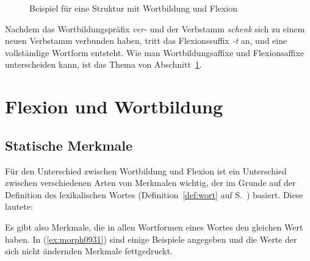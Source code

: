 \begin{figure}[!htbp]
  \centering
  \caption{Beispiel für eine Struktur mit Wortbildung und Flexion}
  \label{fig:flexwbtree}
\end{figure}

Nachdem das Wortbildungspräfix \textit{ver-} und der Verbstamm \textit{schenk} sich zu einem neuen Verbstamm verbunden haben, tritt das Flexionssuffix \textit{-t} an, und eine vollständige Wortform entsteht.
Wie man Wortbildungsaffixe und Flexionsaffixe unterscheiden kann, ist das Thema von Abschnitt~\ref{sec:flexwortbild}.



\section{Flexion und Wortbildung}

\label{sec:flexwortbild}

\subsection{Statische Merkmale}

\label{sec:inhmerk}

Für den Unterschied zwischen Wortbildung und Flexion ist ein Unterschied zwischen verschiedenen Arten von Merkmalen wichtig, der im Grunde auf der Definition des lexikalischen Wortes (Definition~\ref{def:wort} auf S.~\pageref{def:wort}) basiert.
Diese lautete:

\begin{quote}
  \DefWort
\end{quote}

Es gibt also Merkmale, die in allen Wortformen eines Wortes den gleichen Wert haben.
In (\ref{ex:morph0931}) sind einige Beispiele angegeben und die Werte der sich nicht ändernden Merkmale fettgedruckt.

